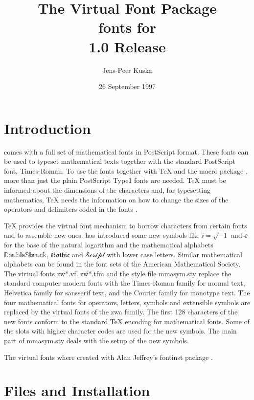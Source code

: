 \documentclass{article}
\begin{document}
 

\title{
The \MathLogo{} Virtual Font Package\\
\MathLogo{} fonts for \LaTeXe{}\\
1.0 Release}
\date{26 September 1997}
\author{Jens-Peer Kuska}
\maketitle

\section{Introduction}

\MathLogo{} comes with a full set of mathematical 
fonts in PostScript format. These fonts can be used
to typeset mathematical texts together with the standard 
PostScript font, Times-Roman. To use the fonts together
with \TeX{} and the macro package \LaTeXe{} \cite{LTeXComp}, more 
than just the plain PostScript Type1 fonts are needed. \TeX{}
must be informed about the dimensions of the characters and,
for typesetting mathematics, \TeX{} needs the information on how
to change the sizes of the operators and delimiters coded in the fonts \cite{TeXBook}.

\TeX{} provides the virtual font mechanism to borrow 
characters from certain fonts and to assemble new ones. 
\MathLogo{} has introduced some new symbols like 
$\ii=\sqrt{-1}$ and $\ee$ for the base of the natural logarithm and
the mathematical alphabets $\mathbb{DoubleStruck}$, $\mathfrak{Gothic}$
and $\mathcal{Script}$ with lower case letters. Similar mathematical
alphabets can be found in the font sets of the American Mathematical
Society. The virtual fonts \textsf{zw*.vf}, \textsf{zw*.tfm} and
the style file \textsf{mmasym.sty} replace the standard computer modern
fonts with the Times-Roman family for normal text, Helvetica family for 
sansserif text, and the Courier family for monotype text. 
The four mathematical fonts for
operators, letters, symbols and extensible symbols are replaced by the
virtual fonts of the \textsf{zwa} family. The first 128 characters of the
new fonts conform to the standard \TeX{} encoding for mathematical 
fonts. Some of the slots with higher character codes are used for the
new symbols. The main part of \textsf{mmasym.sty} deals with the
setup of the new symbols.

The virtual fonts where created with Alan Jeffrey's fontinst package \cite{GrComp}.

\section{Files and Installation}
\end{document}
